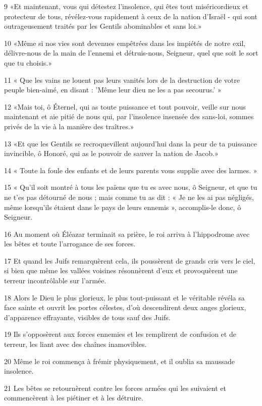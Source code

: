 \par 9 «Et maintenant, vous qui détestez l'insolence, qui êtes tout miséricordieux et protecteur de tous, révélez-vous rapidement à ceux de la nation d'Israël - qui sont outrageusement traités par les Gentils abominables et sans loi.»
\par 10 «Même si nos vies sont devenues empêtrées dans les impiétés de notre exil, délivre-nous de la main de l'ennemi et détruis-nous, Seigneur, quel que soit le sort que tu choisis.»
\par 11 « Que les vains ne louent pas leurs vanités lors de la destruction de votre peuple bien-aimé, en disant : 'Même leur dieu ne les a pas secourus.' »
\par 12 «Mais toi, ô Éternel, qui as toute puissance et tout pouvoir, veille sur nous maintenant et aie pitié de nous qui, par l'insolence insensée des sans-loi, sommes privés de la vie à la manière des traîtres.»
\par 13 «Et que les Gentils se recroquevillent aujourd'hui dans la peur de ta puissance invincible, ô Honoré, qui as le pouvoir de sauver la nation de Jacob.»
\par 14 « Toute la foule des enfants et de leurs parents vous supplie avec des larmes. »
\par 15 « Qu'il soit montré à tous les païens que tu es avec nous, ô Seigneur, et que tu ne t'es pas détourné de nous ; mais comme tu as dit : « Je ne les ai pas négligés, même lorsqu'ils étaient dans le pays de leurs ennemis », accomplis-le donc, ô Seigneur.
\par 16 Au moment où Éléazar terminait sa prière, le roi arriva à l'hippodrome avec les bêtes et toute l'arrogance de ses forces.
\par 17 Et quand les Juifs remarquèrent cela, ils poussèrent de grands cris vers le ciel, si bien que même les vallées voisines résonnèrent d'eux et provoquèrent une terreur incontrôlable sur l'armée.
\par 18 Alors le Dieu le plus glorieux, le plus tout-puissant et le véritable révéla sa face sainte et ouvrit les portes célestes, d'où descendirent deux anges glorieux, d'apparence effrayante, visibles de tous sauf des Juifs.
\par 19 Ils s'opposèrent aux forces ennemies et les remplirent de confusion et de terreur, les liant avec des chaînes inamovibles.
\par 20 Même le roi commença à frémir physiquement, et il oublia sa maussade insolence.
\par 21 Les bêtes se retournèrent contre les forces armées qui les suivaient et commencèrent à les piétiner et à les détruire.
